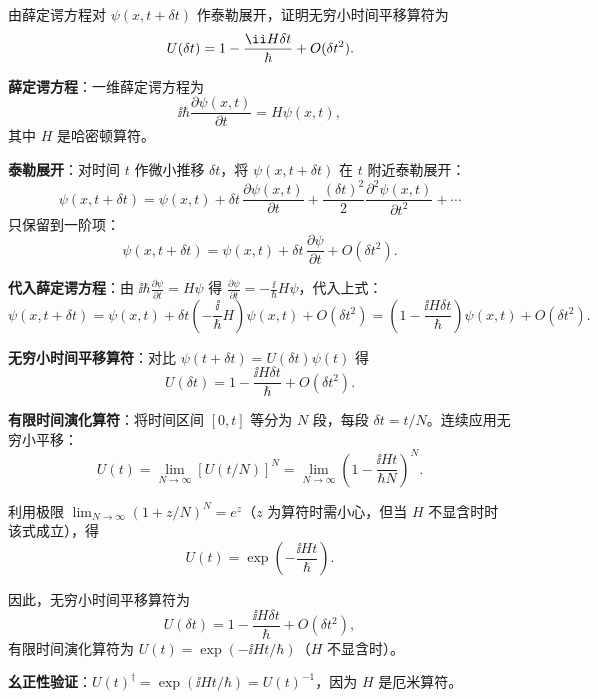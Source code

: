 \begin{question}
由薛定谔方程对 $\psi(x,t+\delta t)$ 作泰勒展开，证明无穷小时间平移算符为
\[
U(\delta t)=1-{\ii H\delta t\over\hbar}+O(\delta t^2).
\]
\end{question}
\begin{solution}
	\textbf{薛定谔方程}：一维薛定谔方程为
	\[
	\ii\hbar\frac{\partial\psi(x,t)}{\partial t} = H\psi(x,t),
	\]
	其中 $H$ 是哈密顿算符。

	\textbf{泰勒展开}：对时间 $t$ 作微小推移 $\delta t$，将 $\psi(x,t+\delta t)$ 在 $t$ 附近泰勒展开：
	\[
	\psi(x,t+\delta t) = \psi(x,t) + \delta t\,\frac{\partial\psi(x,t)}{\partial t} + \frac{(\delta t)^2}{2}\frac{\partial^2\psi(x,t)}{\partial t^2} + \cdots
	\]
	只保留到一阶项：
	\[
	\psi(x,t+\delta t) = \psi(x,t) + \delta t\,\frac{\partial\psi}{\partial t} + O(\delta t^2).
	\]

	\textbf{代入薛定谔方程}：由 $\ii\hbar\frac{\partial\psi}{\partial t}=H\psi$ 得 $\frac{\partial\psi}{\partial t} = -\frac{\ii}{\hbar}H\psi$，代入上式：
	\[
	\psi(x,t+\delta t) = \psi(x,t) + \delta t\left(-\frac{\ii}{\hbar}H\right)\psi(x,t) + O(\delta t^2)
	= \left(1 - \frac{\ii H\delta t}{\hbar}\right)\psi(x,t) + O(\delta t^2).
	\]

	\textbf{无穷小时间平移算符}：对比 $\psi(t+\delta t)=U(\delta t)\psi(t)$ 得
	\[
	U(\delta t) = 1 - \frac{\ii H\delta t}{\hbar} + O(\delta t^2).
	\]

	\textbf{有限时间演化算符}：将时间区间 $[0,t]$ 等分为 $N$ 段，每段 $\delta t = t/N$。连续应用无穷小平移：
	\[
	U(t) = \lim_{N\to\infty} [U(t/N)]^N
	= \lim_{N\to\infty} \left(1 - \frac{\ii H t}{\hbar N}\right)^N.
	\]

	利用极限 $\lim_{N\to\infty}(1+z/N)^N = e^z$（$z$ 为算符时需小心，但当 $H$ 不显含时时该式成立），得
	\[
	U(t) = \exp\!\left(-\frac{\ii H t}{\hbar}\right).
	\]

	因此，无穷小时间平移算符为
	\[
	\boxed{U(\delta t) = 1 - \frac{\ii H\delta t}{\hbar} + O(\delta t^2)},
	\]
	有限时间演化算符为 $\boxed{U(t)=\exp(-\ii H t/\hbar)}$（$H$ 不显含时）。

	\textbf{幺正性验证}：$U(t)^\dagger = \exp(\ii H t/\hbar) = U(t)^{-1}$，因为 $H$ 是厄米算符。
	\end{solution}

